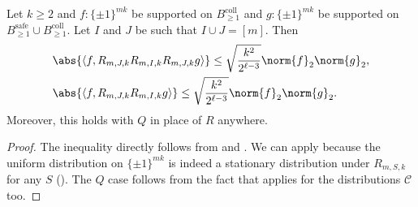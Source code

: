 \begin{lemma}\label{lem:randomize everything}
    Let $k\geq 2$ and $f:\{\pm1\}^{mk}$ be supported on $B_{\geq 1}^{\mathrm{coll}}$ and $g:\{\pm1\}^{mk}$ be supported on $B_{\geq 1}^{\mathrm{safe}}\cup B_{\geq 1}^{\mathrm{coll}}$. Let $I$ and $J$ be such that $I\cup J=[m]$. Then
    \begin{align*}
        &\abs{\left\langle f,R_{m,J,k}R_{m,I,k}R_{m,J,k}g\right\rangle}      \leq\sqrt{\frac{k^2}{2^{\ell-3}}}\norm{f}_2\norm{g}_2,\\
        &\abs{\left\langle f,R_{m,J,k}R_{m,I,k}g\right\rangle}\leq\sqrt{\frac{k^2}{2^{\ell-3}}}\norm{f}_2\norm{g}_2.
    \end{align*}
    Moreover, this holds with $Q$ in place of $R$ anywhere.
\end{lemma}
\begin{proof}
    The inequality directly follows from  and . We can apply  because the uniform distribution on $\{\pm1\}^{mk}$ is indeed a stationary distribution under $R_{m,S,k}$ for any $S$ (). The $Q$ case follows from the fact that  applies for the distributions $\mathcal{C}$ too.
\end{proof}

